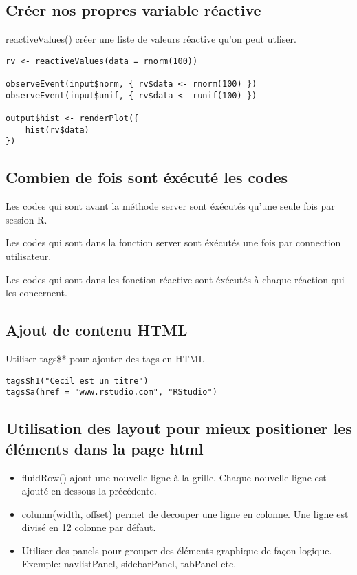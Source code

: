 \documentclass[a4paper]{article}
\begin{document}
\subsection{Créer nos propres variable réactive}
\label{sec:orgd64ac7f}
reactiveValues() créer une liste de valeurs réactive qu'on peut utliser.
\begin{verbatim}
rv <- reactiveValues(data = rnorm(100))

observeEvent(input$norm, { rv$data <- rnorm(100) })
observeEvent(input$unif, { rv$data <- runif(100) })

output$hist <- renderPlot({
    hist(rv$data)
})
\end{verbatim}

\subsection{Combien de fois sont éxécuté les codes}
\label{sec:orgfb35d1e}
Les codes qui sont avant la méthode server sont éxécutés qu'une seule fois par session R.

Les codes qui sont dans la fonction server sont éxécutés une fois par connection utilisateur.

Les codes qui sont dans les fonction réactive sont éxécutés à chaque réaction qui les concernent.

\subsection{Ajout de contenu HTML}
\label{sec:org60701d3}
Utiliser tags\$* pour ajouter des tags en HTML
\begin{verbatim}
tags$h1("Cecil est un titre")
tags$a(href = "www.rstudio.com", "RStudio")
\end{verbatim}


\subsection{Utilisation des layout pour mieux positioner les éléments dans la page html}
\label{sec:org7601d84}
\begin{itemize}
\item fluidRow() ajout une nouvelle ligne à la grille. Chaque nouvelle ligne est ajouté en dessous la précédente.
\item column(width, offset) permet de decouper une ligne en colonne. Une ligne est divisé en 12 colonne par défaut.
\item Utiliser des panels pour grouper des éléments graphique de façon logique. Exemple: navlistPanel, sidebarPanel, tabPanel etc.
\end{itemize}
\end{document}
